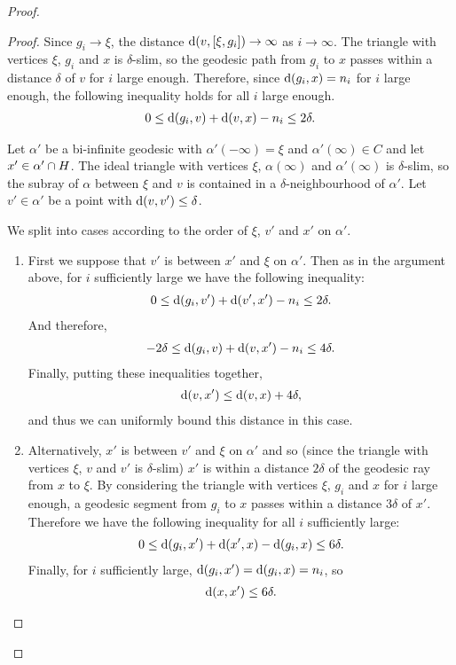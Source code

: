 \documentclass[a4paper]{article}
\begin{document}
\begin{proof}
\begin{proof}
  Since $g_i \to \xi$, the distance $\operatorname{d}(v, [\xi, g_i]) \to \infty$ as
  $i\to\infty$. The triangle with vertices $\xi$, $g_i$ and $x$ is
  $\delta$-slim, so the geodesic path from $g_i$ to $x$ passes within a
  distance $\delta$ of $v$ for $i$ large enough. Therefore, since $\operatorname{d}(g_i,
  x) = n_i$ for $i$ large enough, the following inequality holds for all $i$
  large enough.
  \begin{align*}
    0 \leq \operatorname{d}(g_i, v) + \operatorname{d}(v, x) - n_i \leq 2\delta.
  \end{align*}

  Let $\alpha'$ be a bi-infinite geodesic with $\alpha'(-\infty) = \xi$ and
  $\alpha'(\infty) \in C$ and let $x' \in \alpha' \cap H$. The ideal
  triangle with vertices $\xi$, $\alpha(\infty)$ and $\alpha'(\infty)$ is
  $\delta$-slim, so the subray of $\alpha$ between $\xi$ and $v$ is contained
  in a $\delta$-neighbourhood of $\alpha'$.  Let $v' \in \alpha'$ be a point
  with $\operatorname{d}(v, v') \leq \delta$. 
  
  We split into cases according to the order of $\xi$, $v'$ and $x'$ on
  $\alpha'$.
  \begin{enumerate}
    \item
      First we suppose that $v'$ is between $x'$ and $\xi$ on $\alpha'$. Then as
      in the argument above, for $i$ sufficiently large we have the following
      inequality:
      \begin{align*}
        0 \leq \operatorname{d}(g_i, v') + \operatorname{d}(v', x') - n_i \leq 2\delta.
      \end{align*}
      And therefore,
      \begin{align*}
        -2\delta \leq \operatorname{d}(g_i, v) + \operatorname{d}(v, x') - n_i \leq 4\delta.
      \end{align*}
      Finally, putting these inequalities together,
      \begin{align*}
        \operatorname{d}(v,x') \leq \operatorname{d}(v,x) + 4\delta,
      \end{align*}
      and thus we can uniformly bound this distance in this case.
    \item
      Alternatively, $x'$ is between $v'$ and $\xi$ on $\alpha'$ and so (since
      the triangle with vertices $\xi$, $v$ and $v'$ is $\delta$-slim) $x'$ is
      within a distance $2\delta$ of the geodesic ray from $x$ to $\xi$. By
      considering the triangle with vertices $\xi$, $g_i$ and $x$ for $i$ large
      enough, a geodesic segment from $g_i$ to $x$ passes within a distance
      $3\delta$ of $x'$. Therefore we have the following inequality for all $i$
      sufficiently large:
      \begin{align*}
        0 \leq \operatorname{d}(g_i, x') + \operatorname{d}(x', x) - \operatorname{d}(g_i, x) \leq 6\delta.
      \end{align*}
      Finally, for $i$ sufficiently large, $\operatorname{d}(g_i, x') = \operatorname{d}(g_i, x) = n_i$,
      so
      \begin{align*}
        \operatorname{d}(x,x') \leq 6\delta.
      \end{align*}
  \end{enumerate}
\end{proof}


\end{proof}
\end{document}
